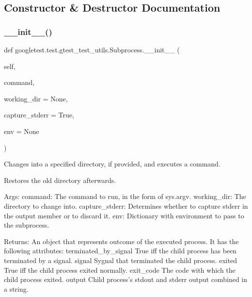 \subsection{Constructor \& Destructor Documentation}
\mbox{\label{classgoogletest_1_1test_1_1gtest__test__utils_1_1_subprocess_a54393b7e39e3a24bf87b563310d837bf}} 
\subsubsection{\texorpdfstring{\_\_init\_\_()}{\_\_init\_\_()}}
{\footnotesize\ttfamily def googletest.\+test.\+gtest\+\_\+test\+\_\+utils.\+Subprocess.\+\_\+\+\_\+init\+\_\+\+\_\+ (\begin{DoxyParamCaption}\item[{}]{self,  }\item[{}]{command,  }\item[{}]{working\+\_\+dir = {\ttfamily None},  }\item[{}]{capture\+\_\+stderr = {\ttfamily True},  }\item[{}]{env = {\ttfamily None} }\end{DoxyParamCaption})}

\begin{DoxyVerb}Changes into a specified directory, if provided, and executes a command.

Restores the old directory afterwards.

Args:
  command:        The command to run, in the form of sys.argv.
  working_dir:    The directory to change into.
  capture_stderr: Determines whether to capture stderr in the output member
              or to discard it.
  env:            Dictionary with environment to pass to the subprocess.

Returns:
  An object that represents outcome of the executed process. It has the
  following attributes:
terminated_by_signal   True iff the child process has been terminated
                       by a signal.
signal                 Sygnal that terminated the child process.
exited                 True iff the child process exited normally.
exit_code              The code with which the child process exited.
output                 Child process's stdout and stderr output
                       combined in a string.
\end{DoxyVerb}
 

